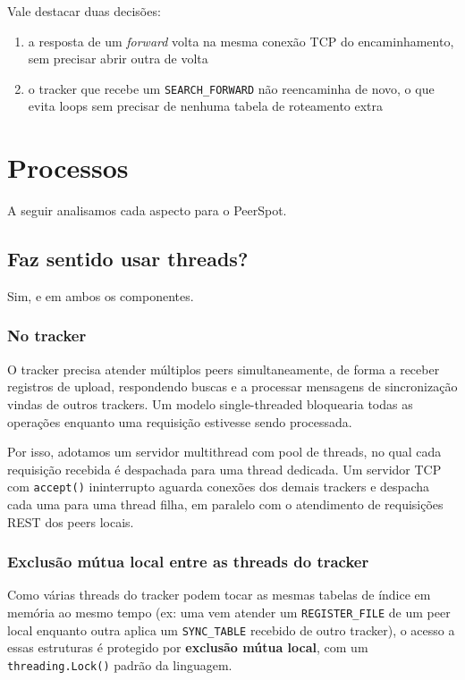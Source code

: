 \documentclass[12pt, a4paper]{article}
\begin{document}
Vale destacar duas decisões:
\begin{enumerate}
    \item a resposta de um \textit{forward} volta na mesma conexão TCP do encaminhamento, sem precisar abrir outra de volta
    \item o tracker que recebe um \texttt{SEARCH\_FORWARD} não reencaminha de novo, o que evita loops sem precisar de nenhuma tabela de roteamento extra
\end{enumerate}

\section{Processos}\label{sec:processos}

A seguir analisamos cada aspecto para o PeerSpot.

\subsection{Faz sentido usar threads?}

Sim, e em ambos os componentes.

\subsubsection*{No tracker}
O tracker precisa atender múltiplos peers simultaneamente, de forma a receber registros de upload, respondendo buscas e a processar mensagens de sincronização vindas de outros trackers. Um modelo single-threaded bloquearia todas as operações enquanto uma requisição estivesse sendo processada.

Por isso, adotamos um servidor multithread com pool de threads, no qual cada requisição recebida é despachada para uma thread dedicada. Um servidor TCP com \texttt{accept()} ininterrupto aguarda conexões dos demais trackers e despacha cada uma para uma thread filha, em paralelo com o atendimento de requisições REST dos peers locais.

\subsubsection*{Exclusão mútua local entre as threads do tracker}
Como várias threads do tracker podem tocar as mesmas tabelas de índice em memória ao mesmo tempo (ex: uma vem atender um \texttt{REGISTER\_FILE} de um peer local enquanto outra aplica um \texttt{SYNC\_TABLE} recebido de outro tracker), o acesso a essas estruturas é protegido por \textbf{exclusão mútua local}, com um \texttt{threading.Lock()} padrão da linguagem. 
\end{document}
